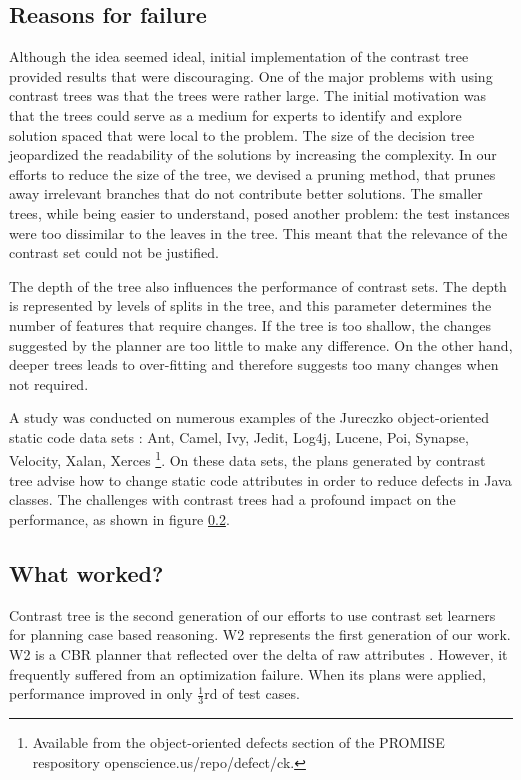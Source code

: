 \documentclass[conference]{IEEEtran}
\begin{document}
\subsection{Reasons for failure}
Although the idea seemed ideal, initial implementation of the contrast tree provided results that were discouraging. One of the major problems with using contrast trees was that the trees were rather large. The initial motivation was that the trees could serve as a medium for experts to identify and explore solution spaced that were local to the problem. The size of the decision tree jeopardized the readability of the solutions by increasing the complexity. In our efforts to reduce the size of the tree, we devised a pruning method, that prunes away irrelevant branches that do not contribute better solutions. The smaller trees, while being easier to understand, posed another problem: the test instances were too dissimilar to the leaves in the tree. This meant that the relevance of the contrast set could not be justified.

The depth of the tree also influences the performance of contrast sets. The depth is represented by levels of splits in the tree, and this parameter determines the number of features that require changes. If the tree is too shallow, the changes suggested by the planner are too little to make any difference. On the other hand, deeper trees leads to over-fitting and therefore suggests too many changes when not required.

A study was conducted on numerous examples of the Jureczko object-oriented static code data sets \cite{}: Ant, Camel, Ivy, Jedit, Log4j, Lucene, Poi, Synapse, Velocity, Xalan, Xerces \footnote{Available from the object-oriented defects section of the PROMISE respository openscience.us/repo/defect/ck.}. On these data sets, the plans generated by contrast tree advise
how to change static code attributes in order to reduce defects in Java classes. The challenges with contrast trees had a profound impact on the performance, as shown in figure \ref{}.
\subsection{What worked?}
Contrast tree is the second generation of our efforts to use contrast set learners for planning case based reasoning. W2 represents the first generation of our work. W2 is a CBR planner that reflected over the delta of raw attributes \cite{}. However, it frequently suffered from an optimization failure. When its plans were applied, performance improved in only  $\tfrac{1}{3}$rd of test cases. 
\end{document}
